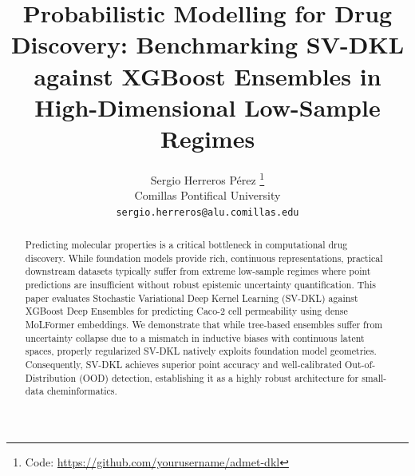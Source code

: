 \documentclass{article}
\title{Probabilistic Modelling for Drug Discovery: Benchmarking SV-DKL against XGBoost Ensembles in High-Dimensional Low-Sample Regimes}
\author{%
  Sergio Herreros Pérez \thanks{Code: \url{https://github.com/yourusername/admet-dkl}} \\
  Comillas Pontifical University\\
  \texttt{sergio.herreros@alu.comillas.edu} \\
}
\begin{document}
\maketitle

\begin{abstract}
Predicting molecular properties is a critical bottleneck in computational drug discovery. While foundation models provide rich, continuous representations, practical downstream datasets typically suffer from extreme low-sample regimes where point predictions are insufficient without robust epistemic uncertainty quantification. This paper evaluates Stochastic Variational Deep Kernel Learning (SV-DKL) against XGBoost Deep Ensembles for predicting Caco-2 cell permeability using dense MoLFormer embeddings. We demonstrate that while tree-based ensembles suffer from uncertainty collapse due to a mismatch in inductive biases with continuous latent spaces, properly regularized SV-DKL natively exploits foundation model geometries. Consequently, SV-DKL achieves superior point accuracy and well-calibrated Out-of-Distribution (OOD) detection, establishing it as a highly robust architecture for small-data cheminformatics.
\end{abstract}









\end{document}
